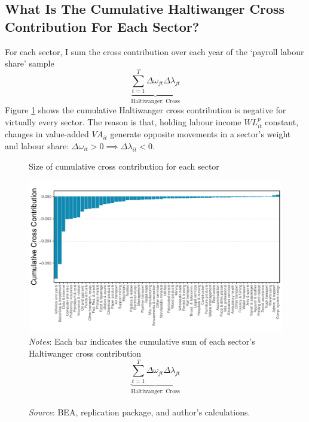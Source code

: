 \subsection{What Is The Cumulative Haltiwanger Cross Contribution For Each Sector? \label{sec: veil}}

For each sector, I sum the cross contribution over each year of the `payroll labour share' sample
\begin{equation*}
    \underbrace{\sum_{t=1}^{T}\Delta\omega_{jt}\Delta\lambda_{jt}}_\text{Haltiwanger: Cross} 
\end{equation*}
Figure \ref{fig:veil} shows the cumulative Haltiwanger cross contribution is negative for virtually every sector. The reason is that, holding labour income $WL_{it}^{p}$ constant, changes in value-added $VA_{it}$ generate opposite movements in a sector's weight and labour share: $\Delta\omega_{it} > 0 \implies \Delta\lambda_{it} < 0$.

\begin{figure}[h]
  \centering
  \caption{\normalsize Size of cumulative cross contribution for each sector}
  \includegraphics[width=14cm]{Decomposition/elsby_veil_total.pdf}
\begin{minipage}{\linewidth}
\captionsetup{justification=raggedright,singlelinecheck=false}
    \caption*{\textit{Notes}: Each bar indicates the cumulative sum of each sector's Haltiwanger cross contribution
  \begin{equation*}
    \underbrace{\sum_{t=1}^{T}\Delta\omega_{jt}\Delta\lambda_{jt}}_\text{Haltiwanger: Cross} 
  \end{equation*} \\
    \textit{Source}: BEA, \citet{elsbyDeclineLaborShare2013a} replication package, and author's calculations.}
\end{minipage}
  \label{fig:veil}
\end{figure}